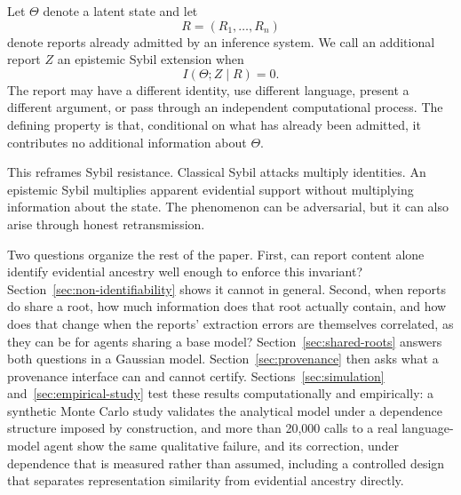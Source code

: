 \documentclass[11pt]{article}
\theoremstyle{definition}
\begin{document}
Let $\Theta$ denote a latent state and let
\[
R=(R_1,\ldots,R_n)
\]
denote reports already admitted by an inference system. We call an additional report $Z$ an epistemic Sybil extension when
\[
I(\Theta;Z\mid R)=0.
\]
The report may have a different identity, use different language, present a different argument, or pass through an independent computational process. The defining property is that, conditional on what has already been admitted, it contributes no additional information about $\Theta$.

This reframes Sybil resistance. Classical Sybil attacks multiply identities. An epistemic Sybil multiplies apparent evidential support without multiplying information about the state. The phenomenon can be adversarial, but it can also arise through honest retransmission.

Two questions organize the rest of the paper. First, can report content alone identify evidential ancestry well enough to enforce this invariant? Section~\ref{sec:non-identifiability} shows it cannot in general. Second, when reports do share a root, how much information does that root actually contain, and how does that change when the reports' extraction errors are themselves correlated, as they can be for agents sharing a base model? Section~\ref{sec:shared-roots} answers both questions in a Gaussian model. Section~\ref{sec:provenance} then asks what a provenance interface can and cannot certify. Sections~\ref{sec:simulation} and~\ref{sec:empirical-study} test these results computationally and empirically: a synthetic Monte Carlo study validates the analytical model under a dependence structure imposed by construction, and more than 20,000 calls to a real language-model agent show the same qualitative failure, and its correction, under dependence that is measured rather than assumed, including a controlled design that separates representation similarity from evidential ancestry directly.
\end{document}
